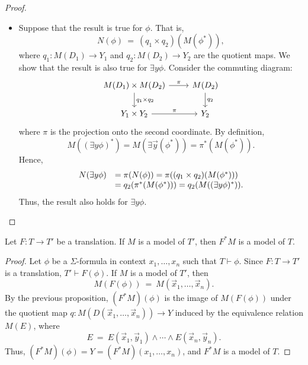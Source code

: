 \begin{proof}
\begin{itemize}
\item Suppose that the result is true for $\phi$.  That is,
  \[ N(\phi ) \: = \: (q_1\times q_2)(M(\phi ^*)) ,\] where
  $q_1:M(D_1)\to Y_1$ and $q_2:M(D_2)\to Y_2$ are the quotient maps.
  We show that the result is also true for $\exists y\phi$.  Consider
  the commuting diagram:
  \[ \begin{tikzcd}
      M(D_1)\times M(D_2) \arrow{r}{\pi} \arrow{d}{q_1\times q_2} & M(D_2) \arrow{d}{q_2}  \\
      Y_1\times Y_2 \arrow{r}{\pi} & Y_2 \end{tikzcd} \] where $\pi$
  is the projection onto the second coordinate.  By definition,
  \[ M((\exists y\phi )^*)=M(\exists \vec{y}(\phi ^*))=\pi ^*(M(\phi
    ^*)) .\] Hence, 
  \[ \begin{array}{l l l} N(\exists y\phi ) & =\pi (N(\phi ))= \pi
                                              ((q_1\times q_2)(M(\phi
                                              ^*))) \\
       & = q_2(\pi ^*(M(\phi ^*))) = q_2(M((\exists y\phi )^*))
         . \end{array} \] Thus, the result also holds for $\exists
     y\phi$. 
  \end{itemize}
\end{proof}

\begin{prop} Let $F:T\to T'$ be a translation.  If $M$ is a model of
  $T'$, then $F^*M$ is a model of $T$. \end{prop}

\begin{proof} Let $\phi$ be a $\Sigma$-formula in context
  $x_1,\dots ,x_n$ such that $T\vdash\phi$.  Since $F:T\to T'$ is a
  translation, $T'\vdash F(\phi )$.  If $M$ is a model of $T'$, then 
  \[ M(F(\phi )) \: = \: M(\vec{x}_1,\dots ,\vec{x}_n) .\] By the
  previous proposition, $(F^*M)(\phi )$ is the image of $M(F(\phi ))$
  under the quotient map $q:M(D(\vec{x}_1,\dots ,\vec{x}_n))\to Y$
  induced by the equivalence relation $M(E)$, where
  \[ E \: = \: E(\vec{x}_1,\vec{y}_1)\wedge\cdots\wedge
    E(\vec{x}_n,\vec{y}_n) .\] Thus,
  $(F^*M)(\phi )=Y=(F^*M)(x_1,\dots ,x_n)$, and $F^*M$ is a model of
  $T$.  \end{proof}

